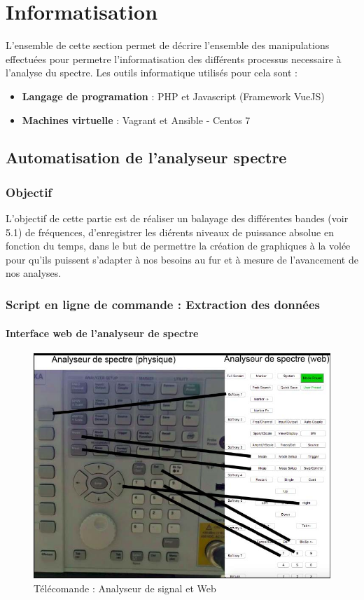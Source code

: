 \section{Informatisation}
\label{sec:informatisation}

L'ensemble de cette section permet de décrire l'ensemble des manipulations effectuées pour permetre l'informatisation
    des différents processus necessaire à l'analyse du spectre.
Les outils informatique utilisés pour cela sont :
\begin{itemize}
  \item \textbf{Langage de programation} : PHP et Javascript (Framework VueJS)
  \item \textbf{Machines virtuelle} : Vagrant et Ansible - Centos 7
\end{itemize}
\subsection{Automatisation de l'analyseur spectre}

\subsubsection{Objectif}
\label{subsec:information_objectif}
L'objectif de cette partie est de réaliser un balayage des différentes bandes
    (voir 5.1) de fréquences,
    d'enregistrer les diérents niveaux de puissance absolue en fonction du temps,
    dans le but de permettre la création de graphiques  à la volée
    pour qu'ils puissent s'adapter à nos besoins au fur et à mesure de l'avancement de nos analyses.



\subsubsection{Script en ligne de commande : Extraction des données}

\paragraph{Interface web de l'analyseur de spectre}


\begin{figure}[ht]
    \centering
    \includegraphics[width=0.5\linewidth]{images/spa/AS_telecomande_web}
    \caption{Télécomande : Analyseur de signal et Web}
    \label{fig:AS_telecomande_web}
\end{figure}

